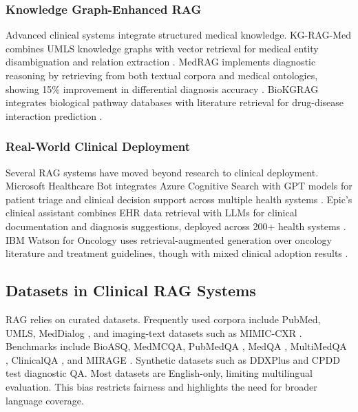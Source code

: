 \subsubsection{Knowledge Graph-Enhanced RAG}
Advanced clinical systems integrate structured medical knowledge. KG-RAG-Med combines UMLS knowledge graphs with vector retrieval for medical entity disambiguation and relation extraction \citep{yasunaga2023kgragmed}. MedRAG implements diagnostic reasoning by retrieving from both textual corpora and medical ontologies, showing 15\% improvement in differential diagnosis accuracy \citep{xiong2024medrag}. BioKGRAG integrates biological pathway databases with literature retrieval for drug-disease interaction prediction \citep{wang2024biokgrag}.

\subsubsection{Real-World Clinical Deployment}
Several RAG systems have moved beyond research to clinical deployment. Microsoft Healthcare Bot integrates Azure Cognitive Search with GPT models for patient triage and clinical decision support across multiple health systems \citep{microsoft2024healthcare}. Epic's clinical assistant combines EHR data retrieval with LLMs for clinical documentation and diagnosis suggestions, deployed across 200+ health systems \citep{epic2024rag}. IBM Watson for Oncology uses retrieval-augmented generation over oncology literature and treatment guidelines, though with mixed clinical adoption results \citep{somashekhar2018watson}.

\subsection{Datasets in Clinical RAG Systems}

RAG relies on curated datasets. Frequently used corpora include PubMed, UMLS, MedDialog \citep{zeng2020meddialog}, and imaging-text datasets such as MIMIC-CXR \citep{johnson2019mimiccxr}. Benchmarks include BioASQ, MedMCQA, PubMedQA \citep{jin2019pubmedqa}, MedQA \citep{jin2021medqa}, MultiMedQA \citep{singhal2023multimedqa}, ClinicalQA \citep{abacha2017nlmclinicalqa}, and MIRAGE \citep{zhu2023mirage}. Synthetic datasets such as DDXPlus \citep{liu2023ddxplus} and CPDD \citep{zhao2025medrag} test diagnostic QA.
Most datasets are English-only, limiting multilingual evaluation. This bias restricts fairness and highlights the need for broader language coverage.

